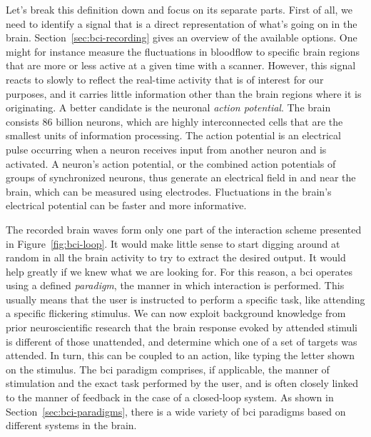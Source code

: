 
Let's break this definition down and focus on its separate parts.
First of all, we need to identify a signal that is a direct representation of
what's going on in the brain.
Section~\ref{sec:bci-recording} gives an overview of the available options.
One might for instance measure the fluctuations in bloodflow to specific brain
regions that are more or less active at a given time with a scanner.
However, this signal reacts to slowly to reflect the real-time activity that is
of interest for our purposes, and it carries little information other than the
brain regions where it is originating.
A better candidate is the neuronal \emph{action potential}.
The brain consists 86 billion neurons, which are highly interconnected cells that are
the smallest units of information processing.
The action potential is an electrical pulse occurring when a neuron receives
input from another neuron and is activated.
A neuron's action potential, or the combined action potentials of groups of
synchronized neurons, thus generate an electrical field in and near the brain,
which can be measured using electrodes.
Fluctuations in the brain's electrical potential can be faster and more
informative.

The recorded brain waves form only one part of the interaction scheme presented
in Figure~\ref{fig:bci-loop}.
It would make little sense to start digging around at random in all the brain
activity to try to extract the desired output.
It would help greatly if we knew what we are looking for.
For this reason, a \ac{bci} operates using a defined \emph{paradigm}, the manner in
which interaction is performed.
This usually means that the user is instructed to perform a specific task, like
attending a specific flickering stimulus.
We can now exploit background knowledge from prior neuroscientific research
that the brain response evoked by attended stimuli is different of those
unattended,
and determine which one of a set of targets was attended.
In turn, this can be coupled to an action, like typing the letter shown on the
stimulus.
The \ac{bci} paradigm comprises, if applicable, the manner of stimulation and the
exact task performed by the user, and is often closely linked to the manner of
feedback in the case of a closed-loop system.
As shown in Section~\ref{sec:bci-paradigms}, there is a wide variety of \ac{bci}
paradigms based on different systems in the brain.

